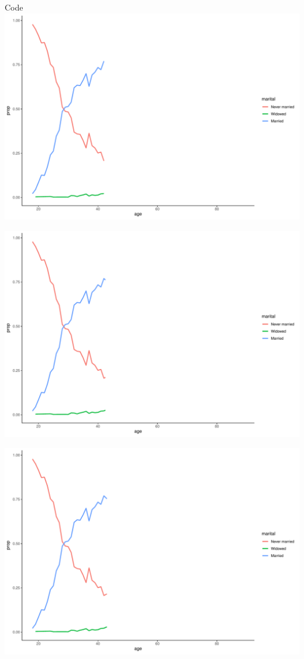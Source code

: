 \documentclass[
  ignorenonframetext,
]{beamer}
\begin{document}
\begin{frame}[fragile]{Code}
\includegraphics{gss_cat_files/figure-beamer/unnamed-chunk-1-38.pdf}

\includegraphics{gss_cat_files/figure-beamer/unnamed-chunk-1-39.pdf}

\includegraphics{gss_cat_files/figure-beamer/unnamed-chunk-1-40.pdf}


\end{frame}
\end{document}
